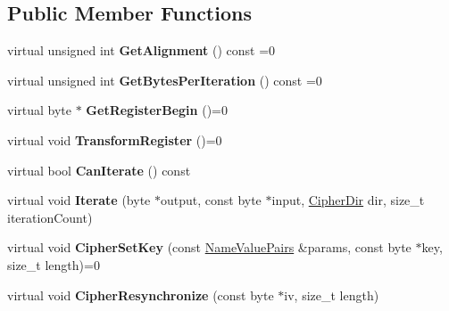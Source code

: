 \subsection*{Public Member Functions}
\begin{DoxyCompactItemize}
\item 
\hypertarget{class_c_f_b___cipher_abstract_policy_a0566346c2cf2d817567d761cbe535210}{
virtual unsigned int {\bfseries GetAlignment} () const =0}
\label{class_c_f_b___cipher_abstract_policy_a0566346c2cf2d817567d761cbe535210}

\item 
\hypertarget{class_c_f_b___cipher_abstract_policy_a17d9940b9130e754375794f65ab96496}{
virtual unsigned int {\bfseries GetBytesPerIteration} () const =0}
\label{class_c_f_b___cipher_abstract_policy_a17d9940b9130e754375794f65ab96496}

\item 
\hypertarget{class_c_f_b___cipher_abstract_policy_a6ed5f67aa6ad1c5625e723ba968bc37b}{
virtual byte $\ast$ {\bfseries GetRegisterBegin} ()=0}
\label{class_c_f_b___cipher_abstract_policy_a6ed5f67aa6ad1c5625e723ba968bc37b}

\item 
\hypertarget{class_c_f_b___cipher_abstract_policy_a3d7f8686375df73407e81066c0b59997}{
virtual void {\bfseries TransformRegister} ()=0}
\label{class_c_f_b___cipher_abstract_policy_a3d7f8686375df73407e81066c0b59997}

\item 
\hypertarget{class_c_f_b___cipher_abstract_policy_aca6e1cd986326d5eb5773d585769b03c}{
virtual bool {\bfseries CanIterate} () const }
\label{class_c_f_b___cipher_abstract_policy_aca6e1cd986326d5eb5773d585769b03c}

\item 
\hypertarget{class_c_f_b___cipher_abstract_policy_a021f82d6099659217e92aabb222200d4}{
virtual void {\bfseries Iterate} (byte $\ast$output, const byte $\ast$input, \hyperlink{cryptlib_8h_a353ccabf5ddc119a6a33e92f7b9961c7}{CipherDir} dir, size\_\-t iterationCount)}
\label{class_c_f_b___cipher_abstract_policy_a021f82d6099659217e92aabb222200d4}

\item 
\hypertarget{class_c_f_b___cipher_abstract_policy_a52637fe1fa1cbde44246ec8fda3debc4}{
virtual void {\bfseries CipherSetKey} (const \hyperlink{class_name_value_pairs}{NameValuePairs} \&params, const byte $\ast$key, size\_\-t length)=0}
\label{class_c_f_b___cipher_abstract_policy_a52637fe1fa1cbde44246ec8fda3debc4}

\item 
\hypertarget{class_c_f_b___cipher_abstract_policy_ace6ce335fb2722f5b0412064058bb2c0}{
virtual void {\bfseries CipherResynchronize} (const byte $\ast$iv, size\_\-t length)}
\label{class_c_f_b___cipher_abstract_policy_ace6ce335fb2722f5b0412064058bb2c0}

\end{DoxyCompactItemize}


